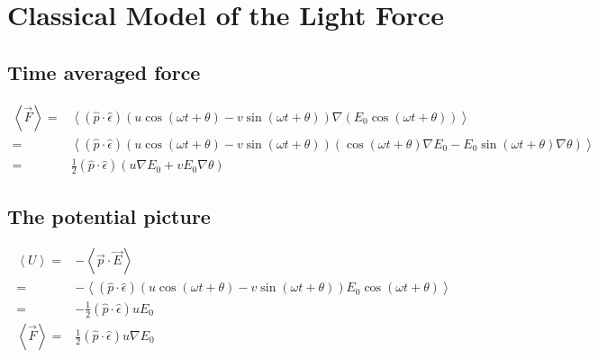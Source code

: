 \documentclass[10pt,fleqn]{article}
\newcommand{\eqar}[1]
{
  \begin{align*}
    #1
  \end{align*}
}
\newcommand{\paren}[1]{{\left({#1}\right)}}
\newcommand{\angl}[1]{{\left\langle{#1}\right\rangle}}
\begin{document}
\section{Classical Model of the Light Force}
\subsection{Time averaged force}
\eqar{
  \angl{\vec F}=&\angl{\paren{\hat p\cdot\hat\epsilon}\paren{u\cos\paren{\omega t+\theta}-v\sin\paren{\omega t+\theta}}\nabla\paren{E_0\cos\paren{\omega t+\theta}}}\\
  =&\angl{\paren{\hat p\cdot\hat\epsilon}\paren{u\cos\paren{\omega t+\theta}-v\sin\paren{\omega t+\theta}}\paren{\cos\paren{\omega t+\theta}\nabla E_0-E_0\sin\paren{\omega t+\theta}\nabla\theta}}\\
  =&\frac12\paren{\hat p\cdot\hat\epsilon}\paren{u\nabla E_0+vE_0\nabla\theta}
}
\subsection{The potential picture}
\eqar{
  \angl{U}=&-\angl{\vec p\cdot\vec E}\\
  =&-\angl{\paren{\hat p\cdot\hat\epsilon}\paren{u\cos\paren{\omega t+\theta}-v\sin\paren{\omega t+\theta}}E_0\cos\paren{\omega t+\theta}}\\
  =&-\frac12\paren{\hat p\cdot\hat\epsilon}uE_0\\
  \angl{\vec F}=&\frac12\paren{\hat p\cdot\hat\epsilon}u\nabla E_0
}
\end{document}
